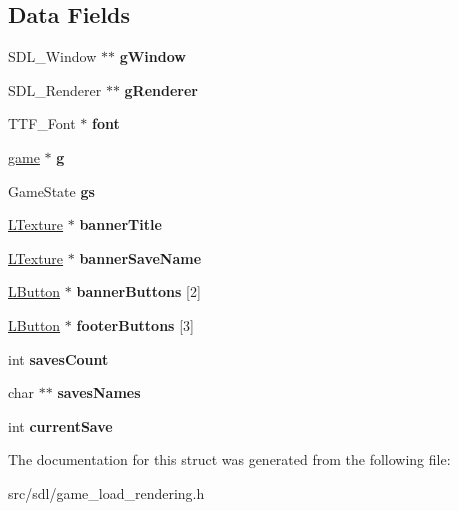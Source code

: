 \subsection*{Data Fields}
\begin{DoxyCompactItemize}
\item 
\mbox{\label{structsdl_preview_a04da60f12d502931bdcc034cad86347f}} 
S\+D\+L\+\_\+\+Window $\ast$$\ast$ {\bfseries g\+Window}
\item 
\mbox{\label{structsdl_preview_ad916adf6a3c707eda83ceefbdee69a26}} 
S\+D\+L\+\_\+\+Renderer $\ast$$\ast$ {\bfseries g\+Renderer}
\item 
\mbox{\label{structsdl_preview_abf5bfa705e66ffc1ddaa6ce46c960873}} 
T\+T\+F\+\_\+\+Font $\ast$ {\bfseries font}
\item 
\mbox{\label{structsdl_preview_a3f3b791c64b074b7d315a41416fd452d}} 
\hyperlink{structt__game}{game} $\ast$ {\bfseries g}
\item 
\mbox{\label{structsdl_preview_a326ac0832310ae96cbae0f489eedac92}} 
Game\+State {\bfseries gs}
\item 
\mbox{\label{structsdl_preview_a0e572169338230e30d01a3b1af9324a1}} 
\hyperlink{structtexture}{L\+Texture} $\ast$ {\bfseries banner\+Title}
\item 
\mbox{\label{structsdl_preview_afc05f8d61660f4e5a5cdd42ad5b365a6}} 
\hyperlink{structtexture}{L\+Texture} $\ast$ {\bfseries banner\+Save\+Name}
\item 
\mbox{\label{structsdl_preview_a898a14b8dbc4ff8f956752cbd5df0aab}} 
\hyperlink{structbutton}{L\+Button} $\ast$ {\bfseries banner\+Buttons} \mbox{[}2\mbox{]}
\item 
\mbox{\label{structsdl_preview_aead1c01f276e85f212e16ce43e14fb14}} 
\hyperlink{structbutton}{L\+Button} $\ast$ {\bfseries footer\+Buttons} \mbox{[}3\mbox{]}
\item 
\mbox{\label{structsdl_preview_a8f92c2e25faedfc1bd2f8bbcc9800367}} 
int {\bfseries saves\+Count}
\item 
\mbox{\label{structsdl_preview_a35a2f07034a53e5087d2d1edfdbdc9f5}} 
char $\ast$$\ast$ {\bfseries saves\+Names}
\item 
\mbox{\label{structsdl_preview_a528aac3c388ec9fffe77578e5b569341}} 
int {\bfseries current\+Save}
\end{DoxyCompactItemize}


The documentation for this struct was generated from the following file\+:\begin{DoxyCompactItemize}
\item 
src/sdl/game\+\_\+load\+\_\+rendering.\+h\end{DoxyCompactItemize}
